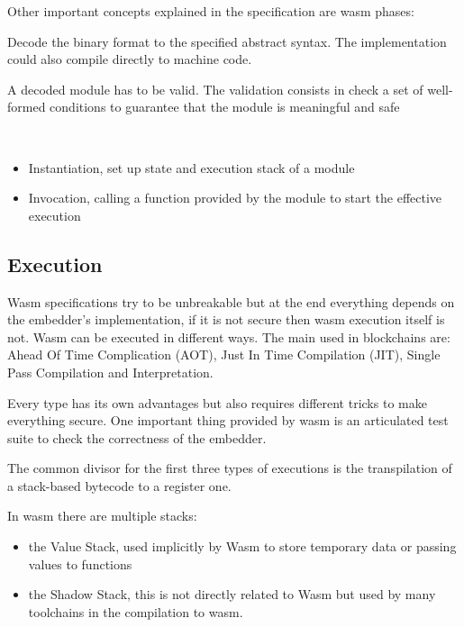 \documentclass[../main.tex]{subfiles}
\begin{document}
Other important concepts explained in the specification are wasm phases:

\begin{description}[font=$\bullet$ \scshape\bfseries]
  \item[Decoding]
        Decode the binary format to the specified abstract syntax. The implementation could also compile directly to machine code.
  \item[Validation]
        A decoded module has to be valid. The validation consists in check a set of well-formed conditions to guarantee that the module is meaningful and safe ~\cite{wasm-polkadot-wiki}
  \item[Execution]

        \

        \begin{itemize}
          \item Instantiation, set up state and execution stack of a module
          \item Invocation, calling a function provided by the module to start the effective execution
        \end{itemize}
\end{description}

\subsection{Execution}

Wasm specifications try to be unbreakable but at the end everything depends on the embedder's implementation, if it is not secure then wasm execution itself is not. Wasm can be executed in different ways. The main used in blockchains are: Ahead Of Time Complication (AOT), Just In Time Compilation (JIT), Single Pass Compilation and Interpretation.



Every type has its own advantages but also requires different tricks to make everything secure. One important thing provided by wasm is an articulated test suite to check the correctness of the embedder. ~\cite{wasm-testsuite}

The common divisor for the first three types of executions is the transpilation of a stack-based bytecode to a register one.

In wasm there are multiple stacks:
       \begin{itemize}
          \item the Value Stack, used implicitly by Wasm to store temporary data or passing values to functions
          \item  the Shadow Stack, this is not directly related to Wasm but used by many toolchains in the compilation to wasm.
        \end{itemize}
 
\end{document}
